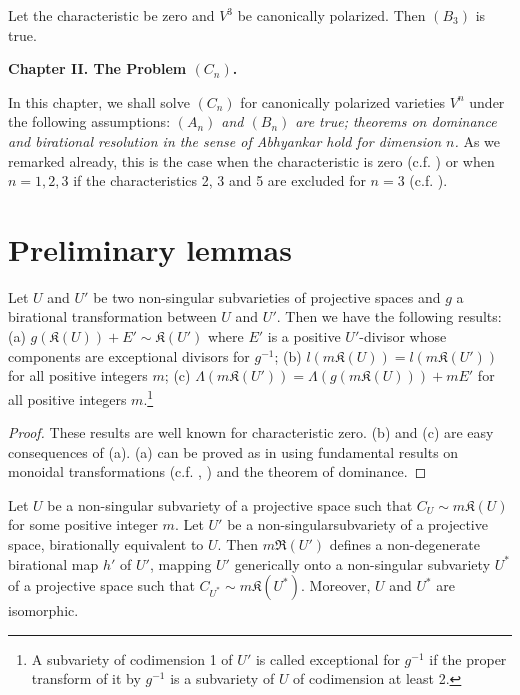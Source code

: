 \begin{coro*}
Let the characteristic be zero and $V^{3}$ be canonically polarized. Then $(B_{3})$ is true.
\end{coro*}

\bigskip

\begin{center}
{\Large\bf Chapter II. The Problem \boldmath$(C_{n})$.}
\end{center}

In this chapter, we shall solve $(C_{n})$ for canonically polarized varieties $V^{n}$ under the following assumptions: {\em $(A_{n})$ and $(B_{n})$ are true; theorems on dominance and birational resolution in the sense of Abhyankar hold for dimension $n$.} As we remarked already, this is the case when the characteristic is zero (c.f. \cite{art14-key5}) or when $n=1,2,3$ if the characteristics 2, 3 and 5 are excluded for $n=3$ (c.f. \cite{art14-key35}).

\section{Preliminary lemmas}\label{art14-sec8}

\begin{lemma}\label{art14-lem12}
Let $U$ and $U'$ be two non-singular subvarieties of projective spaces and $g$ a birational transformation between $U$ and $U'$. Then we have the following results: {\rm(a)} $g(\mathfrak{K}(U))+E'\sim \mathfrak{K}(U')$ where $E'$ is a positive $U'$-divisor whose components are exceptional divisors for $g^{-1}$; {\rm(b)} $l(m\mathfrak{K}(U))=l(m\mathfrak{K}(U'))$ for all positive integers $m$; {\rm(c)} $\Lambda(m\mathfrak{K}(U'))=\Lambda(g(m\mathfrak{K}(U)))+mE'$ for all positive integers $m$.\footnote{A subvariety of codimension 1 of $U'$ is called exceptional for $g^{-1}$ if the proper transform of it by $g^{-1}$ is a subvariety of $U$ of codimension at least 2.} 
\end{lemma}

\begin{proof}
These results are well known for characteristic zero. (b) and (c) are easy consequences of (a). (a) can be proved as in \cite{art14-key33} using fundamental results on monoidal transformations (c.f. \cite{art14-key29}, \cite{art14-key33}) and the theorem of dominance.
\end{proof}

\begin{lemma}\label{art14-lem13}
Let $U$ be a non-singular subvariety of a projective space such that $C_{U}\sim m\mathfrak{K}(U)$ for some positive integer $m$. Let $U'$ be a non-singular\pageoriginale subvariety of a projective space, birationally equivalent to $U$. Then $m\mathfrak{R}(U')$ defines a non-degenerate birational map $h'$ of $U'$, mapping $U'$ generically onto a non-singular subvariety $U^{*}$ of a projective space such that $C_{U^{*}}\sim m\mathfrak{K}(U^{*})$. Moreover, $U$ and $U^{*}$ are isomorphic.
\end{lemma}

